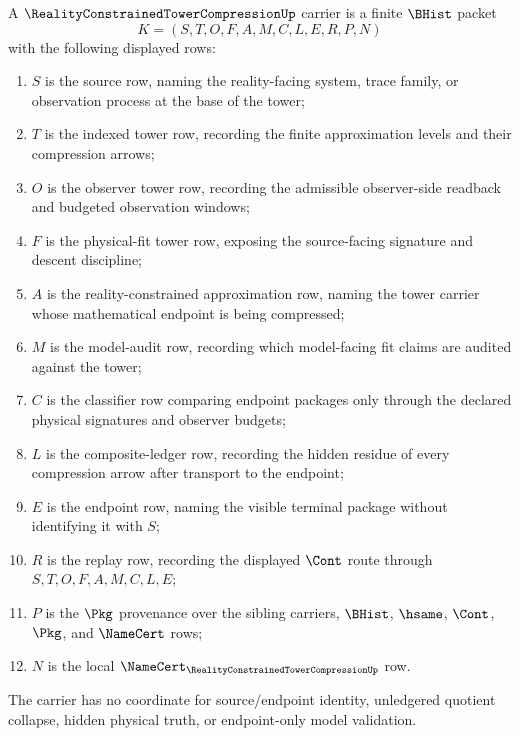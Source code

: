 \begin{definition}
\label{def:reality-constrained-tower-compression-carrier}
A $\RealityConstrainedTowerCompressionUp$ carrier is a finite $\BHist$ packet
$$
K=(S,T,O,F,A,M,C,L,E,R,P,N)
$$
with the following displayed rows:
\begin{enumerate}
\item $S$ is the source row, naming the reality-facing system, trace family, or observation process at the base of the tower;
\item $T$ is the indexed tower row, recording the finite approximation levels and their compression arrows;
\item $O$ is the observer tower row, recording the admissible observer-side readback and budgeted observation windows;
\item $F$ is the physical-fit tower row, exposing the source-facing signature and descent discipline;
\item $A$ is the reality-constrained approximation row, naming the tower carrier whose mathematical endpoint is being compressed;
\item $M$ is the model-audit row, recording which model-facing fit claims are audited against the tower;
\item $C$ is the classifier row comparing endpoint packages only through the declared physical signatures and observer budgets;
\item $L$ is the composite-ledger row, recording the hidden residue of every compression arrow after transport to the endpoint;
\item $E$ is the endpoint row, naming the visible terminal package without identifying it with $S$;
\item $R$ is the replay row, recording the displayed $\Cont$ route through $S,T,O,F,A,M,C,L,E$;
\item $P$ is the $\Pkg$ provenance over the sibling carriers, $\BHist$, $\hsame$, $\Cont$, $\Pkg$, and $\NameCert$ rows;
\item $N$ is the local $\NameCert_{\RealityConstrainedTowerCompressionUp}$ row.
\end{enumerate}
The carrier has no coordinate for source/endpoint identity, unledgered quotient collapse, hidden physical truth, or endpoint-only model validation.
\end{definition}

